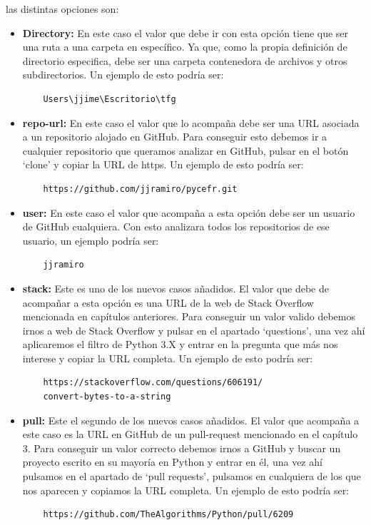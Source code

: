 \documentclass[a4paper, 12pt]{book}
\begin{document}
las distintas opciones son:

\begin{itemize}
	\item \textbf{Directory:} En este caso el valor que debe ir con esta opción tiene que ser una ruta a una carpeta en específico. Ya que, como la propia definición de directorio especifica, debe ser una carpeta contenedora de archivos y otros subdirectorios. Un ejemplo de esto podría ser:
	\begin{verbatim}
	Users\jjime\Escritorio\tfg
	\end{verbatim}
	\item \textbf{repo-url:} En este caso el valor que lo acompaña debe ser una URL asociada a un repositorio alojado en GitHub. Para conseguir esto debemos ir a cualquier repositorio que queramos analizar en GitHub, pulsar en el botón `clone' y copiar la URL de https. Un ejemplo de esto podría ser:
	\begin{verbatim}
	https://github.com/jjramiro/pycefr.git
	\end{verbatim}
	\item \textbf{user:} En este caso el valor que acompaña a esta opción debe ser un usuario de GitHub cualquiera. Con esto analizara todos los repositorios de ese usuario, un ejemplo podría ser:
	\begin{verbatim}
	jjramiro
	\end{verbatim}
	\item \textbf{stack:} Este es uno de los nuevos casos añadidos. El valor que debe de acompañar a esta opción es una URL de la web de Stack Overflow mencionada en capítulos anteriores. Para conseguir un valor valido debemos irnos a web de Stack Overflow y pulsar en el apartado `questions', una vez ahí aplicaremos el filtro de Python 3.X y entrar en la pregunta que más nos interese y copiar la URL completa. Un ejemplo de esto podría ser:
	\begin{verbatim}
	https://stackoverflow.com/questions/606191/
	convert-bytes-to-a-string
	\end{verbatim}
	\item \textbf{pull:} Este el segundo de los nuevos  casos añadidos. El valor que acompaña a este caso es la URL en GitHub de un pull-request mencionado en el capítulo 3. Para conseguir un valor correcto debemos irnos a GitHub y buscar un proyecto escrito en su mayoría en Python y entrar en él, una vez ahí pulsamos en el apartado de `pull requests', pulsamos en cualquiera de los que nos aparecen y copiamos la URL completa. Un ejemplo de esto podría ser:
	\begin{verbatim}
	https://github.com/TheAlgorithms/Python/pull/6209
	\end{verbatim}
\end{itemize}
\end{document}
